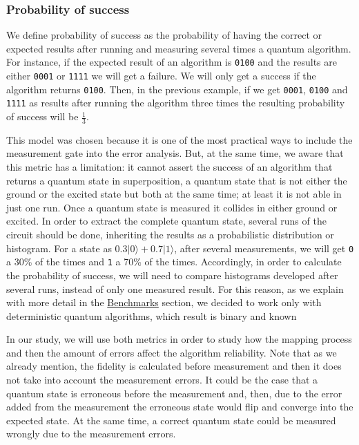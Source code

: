 
\subsubsection{Probability of success}

We define probability of success as the probability of having the correct or expected results after running and measuring several times a quantum algorithm.
For instance, if the expected result of an algorithm is \texttt{0100} and the results are either \texttt{0001} or \texttt{1111} we will get a failure.
We will only get a success if the algorithm returns \texttt{0100}.
Then, in the previous example, if we get \texttt{0001}, \texttt{0100} and \texttt{1111} as results after running the algorithm three times the resulting probability of success will be \(\frac{1}{3}\).

This model was chosen because it is one of the most practical ways to include the measurement gate into the error analysis.
But, at the same time, we aware that this metric has a limitation: it cannot assert the success of an algorithm that returns a quantum state in superposition, a quantum state that is not either the ground or the excited state but both at the same time; at least it is not able in just one run.
Once a quantum state is measured it collides in either ground or excited.
In order to extract the complete quantum state, several runs of the circuit should be done, inheriting the results as a probabilistic distribution or histogram.
For a state as \(0.3 | 0 \rangle + 0.7 | 1 \rangle\), after several measurements, we will get \texttt{0} a 30\% of the times and \texttt{1} a 70\% of the times.
Accordingly, in order to calculate the probability of success, we will need to compare histograms developed after several runs, instead of only one measured result.
For this reason, as we explain with more detail in the \hyperref[sec:org17c0cef]{Benchmarks} section, we decided to work only with deterministic quantum algorithms, which result is binary and known


In our study, we will use both metrics in order to study how the mapping process and then the amount of errors affect the  algorithm reliability.
Note that as we already mention, the fidelity is calculated before measurement and then it does  not take into account the measurement errors. It could be the case that a quantum state is erroneous before the measurement and, then, due to the error added from the measurement the erroneous state would flip and converge into the expected state.
At the same time, a correct quantum state could be measured wrongly due to the measurement errors.

